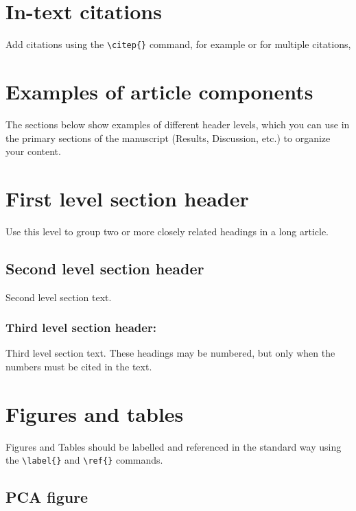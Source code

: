 \documentclass[9pt, onecolumn,twoside]{gsajnl}
\begin{document}
\section{In-text citations}

Add citations using the \verb|\citep{}| command, for example \citep{neher2013genealogies} or for multiple citations, \citep{neher2013genealogies, rodelsperger2014characterization,Falush16}

\section{Examples of article components}
\label{sec:examples}

The sections below show examples of different header levels, which you can use in the primary sections of the manuscript (Results, Discussion, etc.) to organize your content.

\section{First level section header}

Use this level to group two or more closely related headings in a long article.

\subsection{Second level section header}

Second level section text.

\subsubsection{Third level section header:}

Third level section text. These headings may be numbered, but only when the numbers must be cited in the text.

\section{Figures and tables}

Figures and Tables should be labelled and referenced in the standard way using the \verb|\label{}| and \verb|\ref{}| commands.

\subsection{PCA figure}
\end{document}
